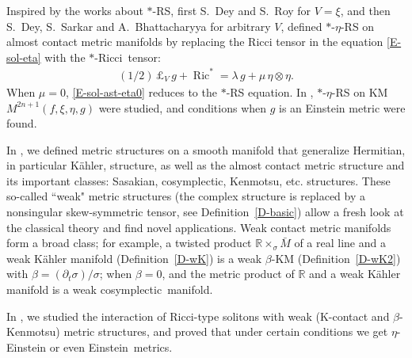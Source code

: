 \documentclass[11pt,a4paper,twoside]{article}
\def\Ric{\operatorname{Ric}}
\begin{document}
{Inspired by the works about $\ast$-RS, first S.~Dey and S.~Roy \cite{DeyRoy-2020} for $V=\xi$,
and then S.~Dey, S.~Sarkar and A.~Bhattacharyya \cite{DSB-2024} for arbitrary $V$, defined $\ast$-$\eta$-RS on almost contact metric manifolds by replacing the Ricci tensor in the equation \eqref{E-sol-eta} with the $\ast$-Ricci~tensor:
\begin{align}\label{E-sol-ast-eta0}
 (1/2)\,\pounds_V\,g+\Ric^\ast=\lambda\,g +\mu\,\eta\otimes\eta.
\end{align}
When $\mu=0$, \eqref{E-sol-ast-eta0} reduces to the $\ast$-RS equation.
In \cite{DSB-2024,ven-2022}, $\ast$-$\eta$-RS on KM $M^{2n+1}(f,\xi,\eta,g)$ were studied, and conditions when $g$ is %
an Einstein metric were found.

\smallskip

In  \cite{RWo-2,rov-119}, we defined metric structures on a smooth manifold
that generalize Hermitian, in parti\-cular K\"{a}hler, structure, as well as the almost contact metric structure and its important classes: Sasakian, cosymplectic, Kenmotsu, etc. structures.
These so-called ``weak" metric structures (the complex structure
is replaced by a nonsingular skew-symmetric tensor,
see Definition~\ref{D-basic}) allow a fresh look at the classical theory and find novel applications.
Weak contact metric manifolds form a broad class; for example, a twisted product $\mathbb{R}\times_\sigma\bar M$
of a real line and a weak K\"{a}hler manifold (Definition~\ref{D-wK}) is a weak $\beta$-KM (Definition~\ref{D-wK2}) with $\beta=(\partial_t\sigma)/\sigma$;
when $\beta=0$, and the metric product of $\mathbb{R}$ and a weak K\"{a}hler manifold is a weak cosymplectic~manifold.

In \cite{rst-55,rov-126}, we studied the interaction of Ricci-type solitons with weak (K-contact and $\beta$-Kenmotsu) metric structures, and proved that under certain conditions we get $\eta$-Einstein or even Einstein~metrics.

}
\end{document}
